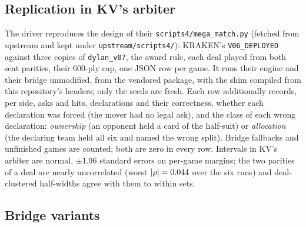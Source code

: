 \documentclass[11pt]{article}
\newcommand{\code}[1]{\texttt{#1}}
\begin{document}
\subsection{Replication in KV's arbiter}
\label{sec:m-kv}

The driver reproduces the design of their \code{scripts4/mega\_match.py} (fetched from upstream and
kept under \code{upstream/scripts4/}): KRAKEN's \code{V06\_DEPLOYED} against three copies of
\code{dylan\_v07}, the award rule, each deal played from both seat parities, their 600-ply cap, one
JSON row per game. It runs their engine and their bridge
unmodified, from the vendored package, with the shim compiled from this repository's headers; only the
seeds are fresh. Each row additionally records, per side, asks and hits, declarations and their
correctness, whether each declaration was forced (the mover had no legal ask), and the class of each
wrong declaration: \emph{ownership} (an opponent held a card of the half-suit) or \emph{allocation}
(the declaring team held all six and named the wrong split). Bridge fallbacks and unfinished games are
counted; both are zero in every row. Intervals in KV's arbiter are normal, $\pm 1.96$ standard errors
on per-game margins; the two parities of a deal are nearly uncorrelated (worst $|\rho| =
0.044$ over the six runs) and deal-clustered half-widths agree with them to within
\kcVMaxClusterDiff{} sets.

\subsection{Bridge variants}
\label{sec:m-variants}
\end{document}
